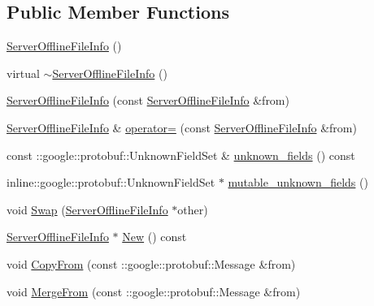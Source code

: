 \subsection*{Public Member Functions}
\begin{DoxyCompactItemize}
\item 
\hyperlink{class_i_m_1_1_base_define_1_1_server_offline_file_info_a717e72985a84ed1bbf65a7f173b558c5}{Server\+Offline\+File\+Info} ()
\item 
virtual \hyperlink{class_i_m_1_1_base_define_1_1_server_offline_file_info_ac95068c5bb3073d55aef4c73d9c64400}{$\sim$\+Server\+Offline\+File\+Info} ()
\item 
\hyperlink{class_i_m_1_1_base_define_1_1_server_offline_file_info_abb1da4937a6b241baa5af509e54ee019}{Server\+Offline\+File\+Info} (const \hyperlink{class_i_m_1_1_base_define_1_1_server_offline_file_info}{Server\+Offline\+File\+Info} \&from)
\item 
\hyperlink{class_i_m_1_1_base_define_1_1_server_offline_file_info}{Server\+Offline\+File\+Info} \& \hyperlink{class_i_m_1_1_base_define_1_1_server_offline_file_info_ab20e6130c72238260c4f204febd35d8b}{operator=} (const \hyperlink{class_i_m_1_1_base_define_1_1_server_offline_file_info}{Server\+Offline\+File\+Info} \&from)
\item 
const \+::google\+::protobuf\+::\+Unknown\+Field\+Set \& \hyperlink{class_i_m_1_1_base_define_1_1_server_offline_file_info_a89c34649b2c439f075ff2c04e9531fc7}{unknown\+\_\+fields} () const 
\item 
inline\+::google\+::protobuf\+::\+Unknown\+Field\+Set $\ast$ \hyperlink{class_i_m_1_1_base_define_1_1_server_offline_file_info_afb5ad9143cecc50bedebd38935787e9a}{mutable\+\_\+unknown\+\_\+fields} ()
\item 
void \hyperlink{class_i_m_1_1_base_define_1_1_server_offline_file_info_a888dce420dbdb1d80355a6a01d91a2a6}{Swap} (\hyperlink{class_i_m_1_1_base_define_1_1_server_offline_file_info}{Server\+Offline\+File\+Info} $\ast$other)
\item 
\hyperlink{class_i_m_1_1_base_define_1_1_server_offline_file_info}{Server\+Offline\+File\+Info} $\ast$ \hyperlink{class_i_m_1_1_base_define_1_1_server_offline_file_info_a6f030a1b9afaa7e30f1dd561fe3f1086}{New} () const 
\item 
void \hyperlink{class_i_m_1_1_base_define_1_1_server_offline_file_info_ac76702d33791fe87590f5e4e15b35a1d}{Copy\+From} (const \+::google\+::protobuf\+::\+Message \&from)
\item 
void \hyperlink{class_i_m_1_1_base_define_1_1_server_offline_file_info_a785c2d43344e80f78c68fd85a98df8aa}{Merge\+From} (const \+::google\+::protobuf\+::\+Message \&from)

\end{DoxyCompactItemize}
